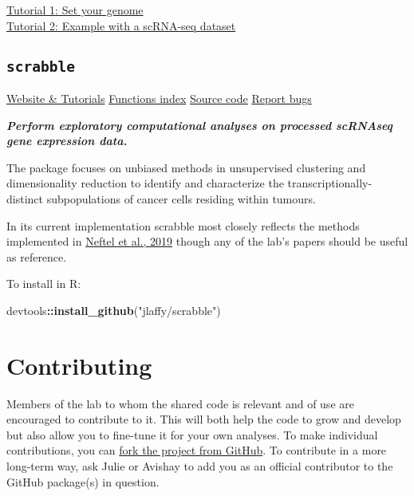 \documentclass[]{book}
\newenvironment{Shaded}{\begin{snugshade}}{\end{snugshade}}
\newcommand{\KeywordTok}[1]{\textcolor[rgb]{0.13,0.29,0.53}{\textbf{#1}}}
\newcommand{\StringTok}[1]{\textcolor[rgb]{0.31,0.60,0.02}{#1}}
\newcommand{\OperatorTok}[1]{\textcolor[rgb]{0.81,0.36,0.00}{\textbf{#1}}}
\newcommand{\NormalTok}[1]{#1}
\begin{document}
\href{https://jlaffy.github.io/infercna/articles/useGenome.html}{Tutorial
1: Set your genome}\\
\href{https://jlaffy.github.io/infercna/articles/infercna_tutorial.html}{Tutorial
2: Example with a scRNA-seq dataset}

\subsection{\texorpdfstring{\texttt{scrabble}}{scrabble}}\label{scrabble}

\href{https://jlaffy.github.io/scrabble}{Website \& Tutorials}
\textbar{}
\href{https://jlaffy.github.io/scrabble/reference/index.html}{Functions
index} \textbar{} \href{https://github.com/jlaffy/scrabble}{Source code}
\textbar{} \href{https://github.com/jlaffy/scrabble/issues}{Report bugs}

\emph{\textbf{Perform exploratory computational analyses on processed
scRNAseq gene expression data.}}

The package focuses on unbiased methods in unsupervised clustering and
dimensionality reduction to identify and characterize the
transcriptionally-distinct subpopulations of cancer cells residing
within tumours.

In its current implementation scrabble most closely reflects the methods
implemented in
\href{https://www.ncbi.nlm.nih.gov/pubmed/31327527}{Neftel et al., 2019}
though any of the lab's papers should be useful as reference.

To install in R:

\begin{Shaded}
\begin{Highlighting}[]
\NormalTok{devtools}\OperatorTok{::}\KeywordTok{install_github}\NormalTok{(}\StringTok{"jlaffy/scrabble"}\NormalTok{)}
\end{Highlighting}
\end{Shaded}

\section{Contributing}\label{contributing}

Members of the lab to whom the shared code is relevant and of use are
encouraged to contribute to it. This will both help the code to grow and
develop but also allow you to fine-tune it for your own analyses. To
make individual contributions, you can
\href{https://help.github.com/en/github/getting-started-with-github/fork-a-repo}{fork
the project from GitHub}. To contribute in a more long-term way, ask
Julie or Avishay to add you as an official contributor to the GitHub
package(s) in question.
\end{document}
